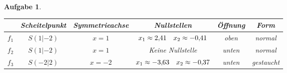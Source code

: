 \documentclass[12pt]{article}
\theoremstyle{note}
\newtheorem{aufgabe}{Aufgabe}
\begin{document}
\begin{flushleft}
\begin{aufgabe}
\begin{minipage}{0.15\textwidth}
\end{minipage} 
\begin{minipage}{0.1\textwidth} 
 ~ \end{minipage} 
\begin{minipage}{0.65\textwidth} 
\renewcommand{\arraystretch}{1.3} 
\begin{tabular}{c|c|c|c|c|c}
 & Scheitelpunkt & Symmetrieachse & Nullstellen & \"Offnung & Form\\ \hline 
$f_1$ & $S(1|-2)$ & $x=1$ & $x_1\approx 2,\hspace{-2pt}41\quad x_2\approx-0,\hspace{-2pt}41$ & oben & normal\\ \hline 
$f_2$ & $S(1|-2)$ & $x=1$ & Keine Nullstelle & unten & normal\\ \hline 
$f_3$ & $S(-2|2)$ & $x=-2$ & $x_1\approx -3,\hspace{-2pt}63\quad x_2\approx-0,\hspace{-2pt}37$ & unten & gestaucht\\ 

\end{tabular} 

\end{minipage} 


\end{aufgabe}
\end{flushleft}
\end{document}
